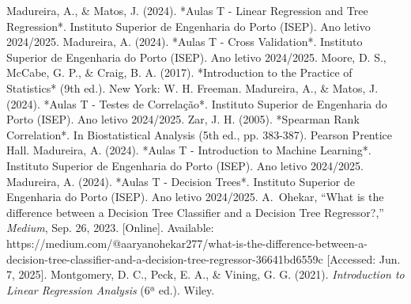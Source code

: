 \documentclass[conference]{IEEEtran}
\begin{document}
\begin{thebibliography}{00}
Madureira, A., \& Matos, J. (2024). *Aulas T - Linear Regression and Tree Regression*. Instituto Superior de Engenharia do Porto (ISEP). Ano letivo 2024/2025.
Madureira, A. (2024). *Aulas T - Cross Validation*. Instituto Superior de Engenharia do Porto (ISEP). Ano letivo 2024/2025.
Moore, D. S., McCabe, G. P., \& Craig, B. A. (2017). *Introduction to the Practice of Statistics* (9th ed.). New York: W. H. Freeman.
Madureira, A., \& Matos, J. (2024). *Aulas T - Testes de Correlação*. Instituto Superior de Engenharia do Porto (ISEP). Ano letivo 2024/2025.
Zar, J. H. (2005). *Spearman Rank Correlation*. In Biostatistical Analysis (5th ed., pp. 383-387). Pearson Prentice Hall.
Madureira, A. (2024). *Aulas T - Introduction to Machine Learning*. Instituto Superior de Engenharia do Porto (ISEP). Ano letivo 2024/2025.
Madureira, A. (2024). *Aulas T - Decision Trees*. Instituto Superior de Engenharia do Porto (ISEP). Ano letivo 2024/2025.
A.~Ohekar, ``What is the difference between a Decision Tree Classifier and a Decision Tree Regressor?,'' \emph{Medium}, Sep. 26, 2023. [Online]. Available: https://medium.com/@aaryanohekar277/what-is-the-difference-between-a-decision-tree-classifier-and-a-decision-tree-regressor-36641bd6559c [Accessed: Jun. 7, 2025].
Montgomery, D. C., Peck, E. A., \& Vining, G. G. (2021). 
\textit{Introduction to Linear Regression Analysis} (6ª ed.). Wiley.




\end{thebibliography}
\end{document}
